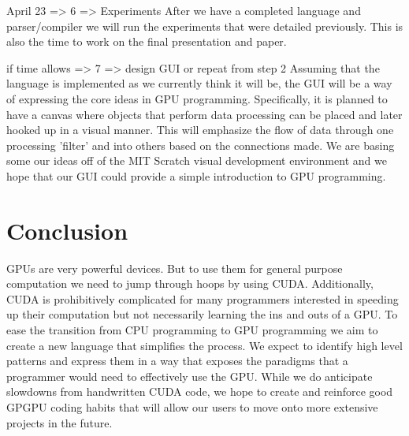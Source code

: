 \documentclass{article}
\begin{document}
April 23 => 6 => Experiments
  After we have a completed language and parser/compiler we will run the experiments that were detailed previously. This is also the time to work on the final presentation and paper. 
  
if time allows => 7 => design GUI or repeat from step 2
  Assuming that the language is implemented as we currently think it will be, the GUI will be a way of expressing the core ideas in GPU programming. Specifically, it is planned to have a canvas where objects that perform data processing can be placed and later hooked up in a visual manner. This will emphasize the flow of data through one processing 'filter' and into others based on the connections made. We are basing some our ideas off of the MIT Scratch visual development environment and we hope that our GUI could provide a simple introduction to GPU programming.

\section{Conclusion}

GPUs are very powerful devices. But to use them for general purpose computation we need to jump through hoops by using CUDA. Additionally, CUDA is prohibitively complicated for many programmers interested in speeding up their computation but not necessarily learning the ins and outs of a GPU. To ease the transition from CPU programming to GPU programming we aim to create a new language that simplifies the process. We expect to identify high level patterns and express them in a way that exposes the paradigms that a programmer would need to effectively use the GPU. While we do anticipate slowdowns from handwritten CUDA code, we hope to create and reinforce good GPGPU coding habits that will allow our users to move onto more extensive projects in the future.




\end{document}
